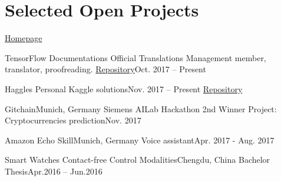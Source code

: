 \section{\textbf{Selected Open Projects}}
  \resumeSubHeadingListStart

    {\href{https://github.com/changkun/}{Homepage}}

    \resumeSubheading
      {TensorFlow Documentations Official Translations}{}
      {Management member, translator, proofreading. \href{https://github.com/xitu/tensorflow-docs}{Repository}}{Oct. 2017 -- Present}

    \resumeSubheading
      {Haggles}{}
      {Personal Kaggle solutions}{Nov. 2017 -- Present}
      \resumeItemListStart
          {\href{https://github.com/changkun/haggles}{Repository}}
      \resumeItemListEnd

    \resumeSubheading
      {Gitchain}{Munich, Germany}
      {Siemens AILab Hackathon 2nd Winner Project: Cryptocurrencies prediction}{Nov. 2017}
      \resumeItemListStart
      \resumeItemListEnd

    \resumeSubheading
      {Amazon Echo Skill}{Munich, Germany}
      {Voice assistant}{Apr. 2017 - Aug. 2017}
      \resumeItemListStart
      \resumeItemListEnd

    \resumeSubheading
      {Smart Watches Contact-free Control Modalities}{Chengdu, China}
      {Bachelor Thesis}{Apr.2016 -- Jun.2016}
      \resumeItemListStart
      \resumeItemListEnd

  \resumeSubHeadingListEnd